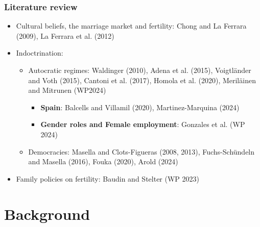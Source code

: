 \documentclass[aspectratio=169]{beamer}
\begin{document}
\begin{frame}
\frametitle{Literature review}
\medskip

\begin{itemize}
\item {\color{blue} Cultural beliefs, the marriage market and fertility:} Chong and La Ferrara (2009), La Ferrara et al. (2012)
    \medskip
\pause
\item {\color{blue}Indoctrination}:
\begin{itemize}
    \medskip

    \item {\color{blue} Autocratic regimes}:  Waldinger (2010), Adena et al. (2015), Voigtländer and Voth (2015), Cantoni et al. (2017), Homola et al. (2020), Meriläinen and Mitrunen (WP2024) 
    \begin{itemize}
    \medskip\pause
        \item \textbf{Spain}: Balcells and Villamil (2020), Martinez-Marquina (2024)\pause
         \item \textbf{Gender roles and Female employment}: Gonzales et al. (WP 2024)
    \end{itemize}
    \medskip
   \pause
    \item {\color{blue}Democracies:} Masella and Clots-Figueras (2008, 2013), Fuchs-Schündeln  and Masella (2016), Fouka (2020), Arold (2024)
\end{itemize}
\pause
      \medskip   
\item {\color{blue}Family policies on fertility}: 
Baudin and Stelter (WP 2023)
\end{itemize}

\end{frame}

\section{Background}
\end{document}
